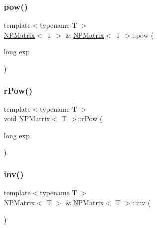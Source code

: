 \mbox{\label{class_n_p_matrix_accdbb7d492c937deebe3812be136541c}} 
\subsubsection{\texorpdfstring{pow()}{pow()}}
{\footnotesize\ttfamily template$<$typename T $>$ \\
\mbox{\hyperlink{class_n_p_matrix}{N\+P\+Matrix}}$<$ T $>$ \& \mbox{\hyperlink{class_n_p_matrix}{N\+P\+Matrix}}$<$ T $>$\+::pow (\begin{DoxyParamCaption}\item[{long}]{exp }\end{DoxyParamCaption})\hspace{0.3cm}{\ttfamily [protected]}}

\mbox{\label{class_n_p_matrix_a94145b4b25e9ce0be81417131d4072d5}} 
\subsubsection{\texorpdfstring{rPow()}{rPow()}}
{\footnotesize\ttfamily template$<$typename T $>$ \\
void \mbox{\hyperlink{class_n_p_matrix}{N\+P\+Matrix}}$<$ T $>$\+::r\+Pow (\begin{DoxyParamCaption}\item[{long}]{exp }\end{DoxyParamCaption})\hspace{0.3cm}{\ttfamily [protected]}}

\mbox{\label{class_n_p_matrix_ac672c69c4b0ec298ac3e8326fcce48cb}} 
\subsubsection{\texorpdfstring{inv()}{inv()}}
{\footnotesize\ttfamily template$<$typename T $>$ \\
\mbox{\hyperlink{class_n_p_matrix}{N\+P\+Matrix}}$<$ T $>$ \& \mbox{\hyperlink{class_n_p_matrix}{N\+P\+Matrix}}$<$ T $>$\+::inv (\begin{DoxyParamCaption}{ }\end{DoxyParamCaption})\hspace{0.3cm}{\ttfamily [protected]}}

